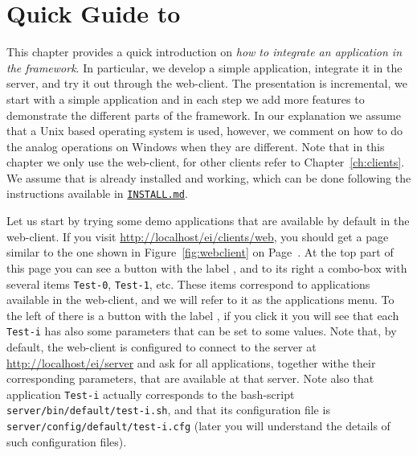 {%
}

\chapter{Quick Guide to \ei}
\label{ch:quickguide}

This chapter provides a quick introduction on \emph{how to integrate
  an application in the \ei framework}. In particular, we develop a
simple application, integrate it in the \ei server, and try it out
through the web-client.
%
The presentation is incremental, we start with a simple application
and in each step we add more features to demonstrate the different
parts of the \ei framework.
%
In our explanation we assume that a Unix based operating system is
used, however, we comment on how to do the analog operations on
Windows when they are different.
%
Note that in this chapter we only use the web-client, for other
clients refer to Chapter~\ref{ch:clients}.
%
We assume that \ei is already installed and working, which can be done
following the instructions available in
\texttt{\href{http://github.com/abstools/easyinterface}{INSTALL.md}}.
%

Let us start by trying some demo applications that are available by
default in the web-client.
%
If you visit \url{http://localhost/ei/clients/web}, you should get a
page similar to the one shown in Figure~\ref{fig:webclient} on
Page~\pageref{fig:webclient}.
%
At the top part of this page you can see a button with the label
\applybutton, and to its right a combo-box with several items
\texttt{Test-0}, \texttt{Test-1}, etc. These items correspond to
applications available in the web-client, and we will refer to it as
the applications menu.
%
To the left of \applybutton there is a button with the label
\settingbutton, if you click it you will see that each \texttt{Test-i}
has also some parameters that can be set to some values.
%
Note that, by default, the web-client is configured to connect to the
\ei server at \url{http://localhost/ei/server} and ask for all
applications, together withe their corresponding parameters, that are
available at that server.
%
Note also that application \texttt{Test-i} actually corresponds to the
bash-script \texttt{server/bin/default/test-i.sh}, and that its
configuration file is \texttt{server/config/default/test-i.cfg} (later
you will understand the details of such configuration files).
%

